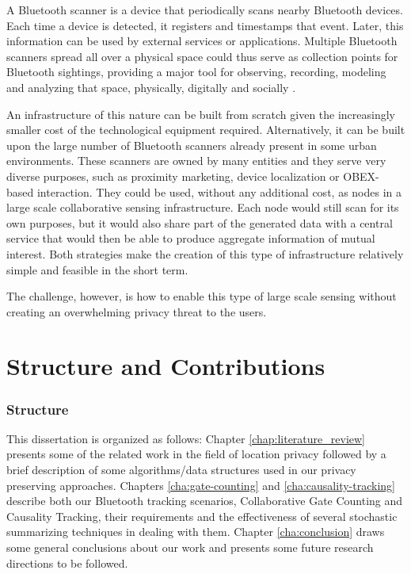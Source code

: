 A Bluetooth scanner is a device that periodically scans nearby
Bluetooth devices. Each time a device is detected, it registers and
timestamps that event. Later, this information can be used by external
services or applications. Multiple Bluetooth scanners spread all over
a physical space could thus serve as collection points for Bluetooth
sightings, providing a major tool for observing, recording, modeling
and analyzing that space, physically, digitally and socially
\cite{Oneill:2006vq}.

An infrastructure of this nature can be built from scratch given
the increasingly smaller cost of the technological equipment required.
Alternatively, it can be built upon the large number of Bluetooth
scanners already present in some urban environments. These scanners
are owned by many entities and they serve very diverse purposes, such
as proximity marketing, device localization or OBEX-based interaction.
They could be used, without any additional cost, as nodes in a large
scale collaborative sensing infrastructure. Each node would still scan
for its own purposes, but it would also share part of the generated
data with a central service that would then be able to produce
aggregate information of mutual interest. Both strategies make the
creation of this type of infrastructure relatively simple and feasible
in the short term.

The challenge, however, is how to enable this type of large scale
sensing without creating an overwhelming privacy threat to the users.


\section{Structure and Contributions}
\label{sec:structure}

\subsubsection{Structure}
\label{sec:structure} This dissertation is organized as follows:
Chapter \ref{chap:literature_review} presents some of the related work
in the field of location privacy followed by a brief description of
some algorithms/data structures used in our privacy preserving
approaches. Chapters \ref{cha:gate-counting} and
\ref{cha:causality-tracking} describe both our Bluetooth tracking
scenarios, Collaborative Gate Counting and Causality Tracking, their
requirements and the effectiveness of several stochastic summarizing
techniques in dealing with them. Chapter \ref{cha:conclusion} draws
some general conclusions about our work and presents some future
research directions to be followed.

